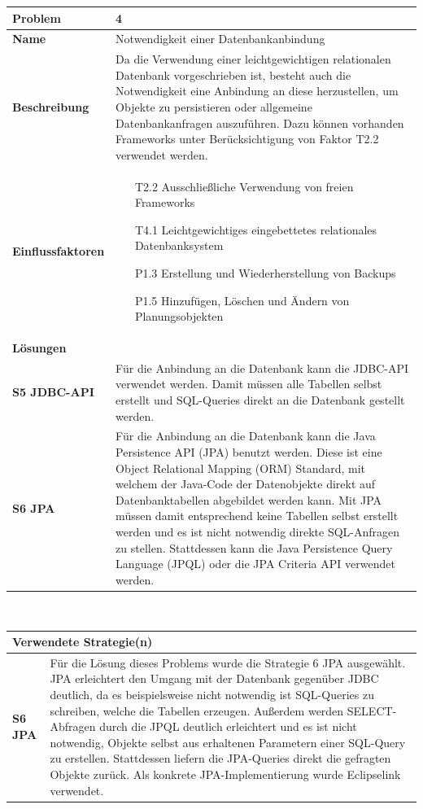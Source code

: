 \documentclass[fontsize=12pt,paper=a4,twoside]{scrartcl}
\begin{document}
\begin{tabularx}{\textwidth}{|p{6cm}|X|}
 \hline
 \textbf{Problem} & 4\\\hline
 \textbf{Name} & Notwendigkeit einer Datenbankanbindung\\\hline 
 \textbf{Beschreibung} & Da die Verwendung einer leichtgewichtigen relationalen Datenbank vorgeschrieben ist, besteht auch die Notwendigkeit eine Anbindung an diese herzustellen, um Objekte zu persistieren oder allgemeine Datenbankanfragen auszuführen. Dazu können vorhanden Frameworks unter Berücksichtigung von Faktor T2.2 verwendet werden.\\\hline
 \textbf{Einflussfaktoren} &
 \begin{itemize}
\item[T2.2] Ausschließliche Verwendung von freien Frameworks
\item[T4.1] Leichtgewichtiges eingebettetes relationales Datenbanksystem
\item[P1.3] Erstellung und Wiederherstellung von Backups
\item[P1.5] Hinzufügen, Löschen und Ändern von Planungsobjekten
 \end{itemize}\\\hline
\multicolumn{2}{|l|}{\textbf{Lösungen}} \\\hline
\textbf{S5 JDBC-API} & Für die Anbindung an die Datenbank kann die JDBC-API verwendet werden. Damit müssen alle Tabellen selbst erstellt und SQL-Queries direkt an die Datenbank gestellt werden. \\

\textbf{S6 JPA} & Für die Anbindung an die Datenbank kann die Java Persistence API (JPA) benutzt werden. Diese ist eine Object Relational Mapping (ORM) Standard, mit welchem der Java-Code der Datenobjekte direkt auf Datenbanktabellen abgebildet werden kann. Mit JPA müssen damit entsprechend keine Tabellen selbst erstellt werden und es ist nicht notwendig direkte SQL-Anfragen zu stellen. Stattdessen kann die Java Persistence Query Language (JPQL) oder die JPA Criteria API verwendet werden. \\\hline
\end{tabularx}\\

\begin{tabularx}{\textwidth}{|p{6cm}|X|}
 \hline
\multicolumn{2}{|l|}{\textbf{Verwendete Strategie(n)}} \\\hline
 \textbf{S6 JPA}   & Für die Lösung dieses Problems wurde die Strategie 6 JPA ausgewählt. JPA erleichtert den Umgang mit der Datenbank gegenüber JDBC deutlich, da es beispielsweise nicht notwendig ist SQL-Queries zu schreiben, welche die Tabellen erzeugen. Außerdem werden SELECT-Abfragen durch die JPQL deutlich erleichtert und es ist nicht notwendig, Objekte selbst aus erhaltenen Parametern einer SQL-Query zu erstellen. Stattdessen liefern die JPA-Queries direkt die gefragten Objekte zurück. Als konkrete JPA-Implementierung wurde Eclipselink verwendet.\\\hline
\end{tabularx}
\end{document}
